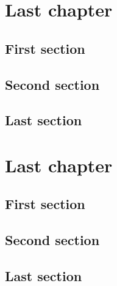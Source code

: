 \documentclass{mines-thesis}
\begin{document}
\chapter{Last chapter} \lipsum[1]
\section{First section} \lipsum[2-3]
\section{Second section} \lipsum[4-5]
\section{Last section} \lipsum[6-7]
\chapter{Last chapter} \lipsum[1]
\section{First section} \lipsum[2-3]
\section{Second section} \lipsum[4-5]
\section{Last section} \lipsum[6-7]
\end{document}

